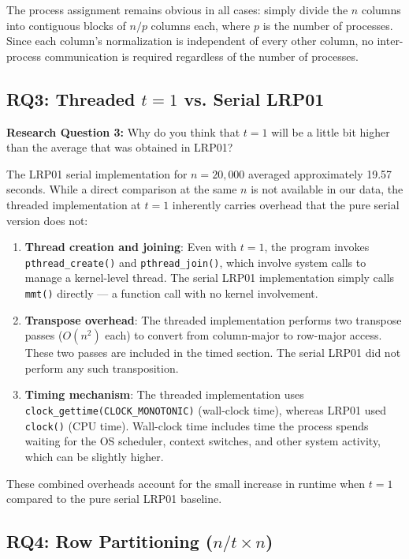 \documentclass[journal]{IEEEtran}
\begin{document}
The process assignment remains obvious in all cases: simply divide the $n$ columns into contiguous blocks of $n / p$ columns each, where $p$ is the number of processes. Since each column's normalization is independent of every other column, no inter-process communication is required regardless of the number of processes.

\subsection{RQ3: Threaded $t = 1$ vs. Serial LRP01}

\textbf{Research Question 3:} Why do you think that $t = 1$ will be a little bit higher than the average that was obtained in LRP01?

The LRP01 serial implementation for $n = 20{,}000$ averaged approximately 19.57 seconds. While a direct comparison at the same $n$ is not available in our data, the threaded implementation at $t = 1$ inherently carries overhead that the pure serial version does not:

\begin{enumerate}
    \item \textbf{Thread creation and joining}: Even with $t = 1$, the program invokes \texttt{pthread\_create()} and \texttt{pthread\_join()}, which involve system calls to manage a kernel-level thread. The serial LRP01 implementation simply calls \texttt{mmt()} directly --- a function call with no kernel involvement.
    
    \item \textbf{Transpose overhead}: The threaded implementation performs two transpose passes ($O(n^2)$ each) to convert from column-major to row-major access. These two passes are included in the timed section. The serial LRP01 did not perform any such transposition.
    
    \item \textbf{Timing mechanism}: The threaded implementation uses \texttt{clock\_gettime(CLOCK\_MONOTONIC)} (wall-clock time), whereas LRP01 used \texttt{clock()} (CPU time). Wall-clock time includes time the process spends waiting for the OS scheduler, context switches, and other system activity, which can be slightly higher.
\end{enumerate}

These combined overheads account for the small increase in runtime when $t = 1$ compared to the pure serial LRP01 baseline.

\subsection{RQ4: Row Partitioning ($n/t \times n$)}
\end{document}
